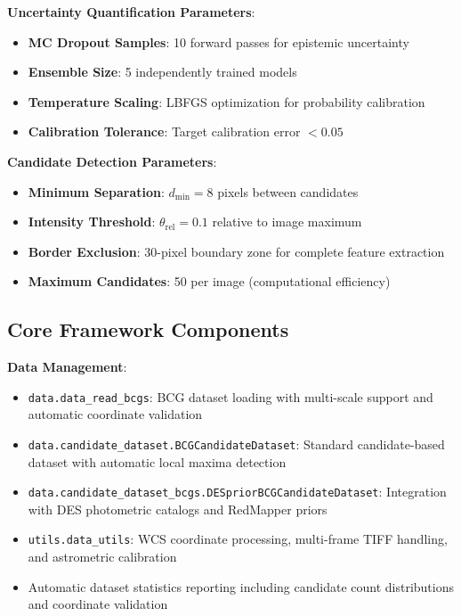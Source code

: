 \documentclass[twocolumn,10pt]{aastex631}
\begin{document}
\textbf{Uncertainty Quantification Parameters}:
\begin{itemize}
\item \textbf{MC Dropout Samples}: 10 forward passes for epistemic uncertainty
\item \textbf{Ensemble Size}: 5 independently trained models
\item \textbf{Temperature Scaling}: LBFGS optimization for probability calibration
\item \textbf{Calibration Tolerance}: Target calibration error $< 0.05$
\end{itemize}

\textbf{Candidate Detection Parameters}:
\begin{itemize}
\item \textbf{Minimum Separation}: $d_{\text{min}} = 8$ pixels between candidates
\item \textbf{Intensity Threshold}: $\theta_{\text{rel}} = 0.1$ relative to image maximum
\item \textbf{Border Exclusion}: 30-pixel boundary zone for complete feature extraction
\item \textbf{Maximum Candidates}: 50 per image (computational efficiency)
\end{itemize}

\subsection{Core Framework Components}

\textbf{Data Management}:
\begin{itemize}
\item \texttt{data.data\_read\_bcgs}: BCG dataset loading with multi-scale support and automatic coordinate validation
\item \texttt{data.candidate\_dataset.BCGCandidateDataset}: Standard candidate-based dataset with automatic local maxima detection
\item \texttt{data.candidate\_dataset\_bcgs.DESpriorBCGCandidateDataset}: Integration with DES photometric catalogs and RedMapper priors
\item \texttt{utils.data\_utils}: WCS coordinate processing, multi-frame TIFF handling, and astrometric calibration
\item Automatic dataset statistics reporting including candidate count distributions and coordinate validation
\end{itemize}
\end{document}
